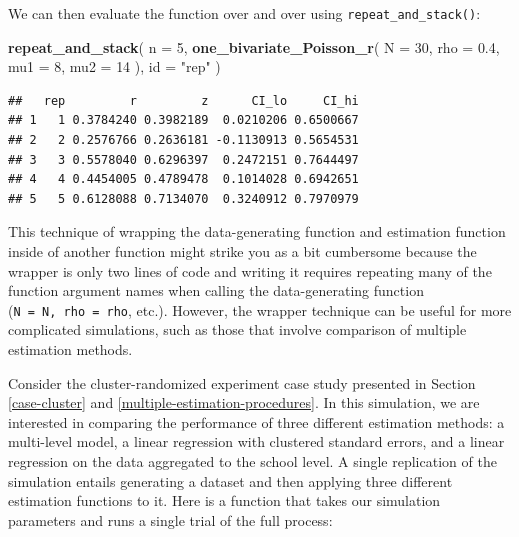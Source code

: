 \documentclass[
]{book}
\newenvironment{Shaded}{\begin{snugshade}}{\end{snugshade}}
\newcommand{\AttributeTok}[1]{\textcolor[rgb]{0.13,0.29,0.53}{#1}}
\newcommand{\DecValTok}[1]{\textcolor[rgb]{0.00,0.00,0.81}{#1}}
\newcommand{\FloatTok}[1]{\textcolor[rgb]{0.00,0.00,0.81}{#1}}
\newcommand{\FunctionTok}[1]{\textcolor[rgb]{0.13,0.29,0.53}{\textbf{#1}}}
\newcommand{\NormalTok}[1]{#1}
\newcommand{\StringTok}[1]{\textcolor[rgb]{0.31,0.60,0.02}{#1}}
\begin{document}
We can then evaluate the function over and over using \texttt{repeat\_and\_stack()}:

\begin{Shaded}
\begin{Highlighting}[]
\FunctionTok{repeat\_and\_stack}\NormalTok{(}
  \AttributeTok{n =} \DecValTok{5}\NormalTok{, }
  \FunctionTok{one\_bivariate\_Poisson\_r}\NormalTok{( }\AttributeTok{N =} \DecValTok{30}\NormalTok{, }\AttributeTok{rho =} \FloatTok{0.4}\NormalTok{, }\AttributeTok{mu1 =} \DecValTok{8}\NormalTok{, }\AttributeTok{mu2 =} \DecValTok{14}\NormalTok{ ), }
  \AttributeTok{id =} \StringTok{"rep"}
\NormalTok{)}
\end{Highlighting}
\end{Shaded}

\begin{verbatim}
##   rep         r         z      CI_lo     CI_hi
## 1   1 0.3784240 0.3982189  0.0210206 0.6500667
## 2   2 0.2576766 0.2636181 -0.1130913 0.5654531
## 3   3 0.5578040 0.6296397  0.2472151 0.7644497
## 4   4 0.4454005 0.4789478  0.1014028 0.6942651
## 5   5 0.6128088 0.7134070  0.3240912 0.7970979
\end{verbatim}

This technique of wrapping the data-generating function and estimation function inside of another function might strike you as a bit cumbersome because the wrapper is only two lines of code and writing it requires repeating many of the function argument names when calling the data-generating function (\texttt{N\ =\ N,\ rho\ =\ rho}, etc.).
However, the wrapper technique can be useful for more complicated simulations, such as those that involve comparison of multiple estimation methods.

Consider the cluster-randomized experiment case study presented in Section \ref{case-cluster} and \ref{multiple-estimation-procedures}.
In this simulation, we are interested in comparing the performance of three different estimation methods: a multi-level model, a linear regression with clustered standard errors, and a linear regression on the data aggregated to the school level.
A single replication of the simulation entails generating a dataset and then applying three different estimation functions to it.
Here is a function that takes our simulation parameters and runs a single trial of the full process:
\end{document}
